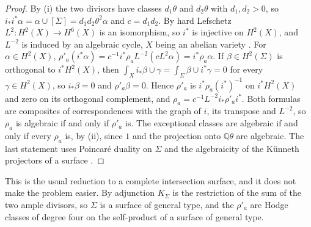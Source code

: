 \documentclass[11pt,reqno]{amsart}
\theoremstyle{plain}
\theoremstyle{definition}
\theoremstyle{remark}
\newcommand{\QQ}{\mathbb{Q}}
\begin{document}
\begin{proof}
By (i) the two divisors have classes $d_{1}\theta$
and $d_{2}\theta$ with $d_{1},d_{2}>0$, so $i_{*}i^{*}\alpha=\alpha\cup
[\Sigma]=d_{1}d_{2}\theta^{2}\alpha$ and $c=d_{1}d_{2}$. By hard Lefschetz
$L^{2}\colon H^{2}(X)\to H^{6}(X)$ is an isomorphism, so $i^{*}$ is injective
on $H^{2}(X)$, and $L^{-2}$ is induced by an algebraic cycle, $X$ being an
abelian variety \cite[\S2]{Kle68}. For $\alpha\in H^{2}(X)$,
$\rho'_{a}(i^{*}\alpha)=c^{-1}i^{*}\rho_{a}L^{-2}(cL^{2}\alpha)=
i^{*}\rho_{a}\alpha$. If $\beta\in H^{2}(\Sigma)$ is orthogonal to
$i^{*}H^{2}(X)$, then $\int_{X}i_{*}\beta\cup\gamma=\int_{\Sigma}\beta\cup
i^{*}\gamma=0$ for every $\gamma\in H^{2}(X)$, so $i_{*}\beta=0$ and
$\rho'_{a}\beta=0$. Hence $\rho'_{a}$ is $i^{*}\rho_{a}(i^{*})^{-1}$ on
$i^{*}H^{2}(X)$ and zero on its orthogonal complement, and
$\rho_{a}=c^{-1}L^{-2}i_{*}\rho'_{a}i^{*}$. Both formulas are composites of
correspondences with the graph of $i$, its transpose and $L^{-2}$, so
$\rho_{a}$ is algebraic if and only if $\rho'_{a}$ is. The exceptional classes
are algebraic if and only if every $\rho_{a}$ is, by
(ii), since $1$ and the projection onto $\QQ\theta$ are
algebraic. The last statement uses Poincar\'e duality on $\Sigma$ and the
algebraicity of the K\"unneth projectors of a surface \cite{Mur90}.
\end{proof}

This is the usual reduction to a complete intersection surface, and it does
not make the problem easier. By adjunction $K_{\Sigma}$ is the restriction of
the sum of the two ample divisors, so $\Sigma$ is a surface of general type,
and the $\rho'_{a}$ are Hodge classes of degree four on the self-product of
a surface of general type.
\end{document}
